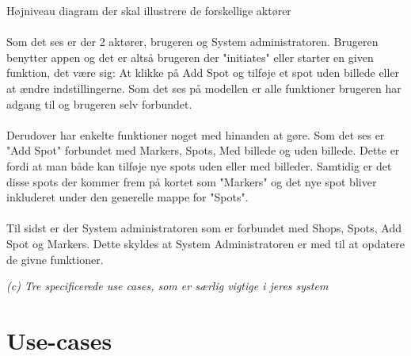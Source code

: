 \documentclass[12pt]{article}
\begin{document}
Højniveau diagram der skal illustrere de forskellige aktører\\\\
Som det ses er der 2 aktører, brugeren og System administratoren. Brugeren benytter appen og det er altså brugeren der "initiates" eller starter en given funktion, det være sig: At klikke på Add Spot og tilføje et spot uden billede eller at ændre indstillingerne. Som det ses på modellen er alle funktioner brugeren har adgang til og brugeren selv forbundet.\\\\ Derudover har enkelte funktioner noget med hinanden at gøre. Som det ses er "Add Spot" forbundet med Markers, Spots, Med billede og uden billede. Dette er fordi at man både kan tilføje nye spots uden eller med billeder. Samtidig er det disse spots der kommer frem på kortet som "Markers" og det nye spot bliver inkluderet under den generelle mappe for "Spots".\\\\
Til sidst er der System administratoren som er forbundet med Shops, Spots, Add Spot og Markers. Dette skyldes at System Administratoren er med til at opdatere de givne funktioner.

\pagebreak
\textit{(c) Tre specificerede use cases, som er særlig vigtige i jeres system}\\
\setlength\parindent{0pt}
\section*{Use-cases}
\end{document}
